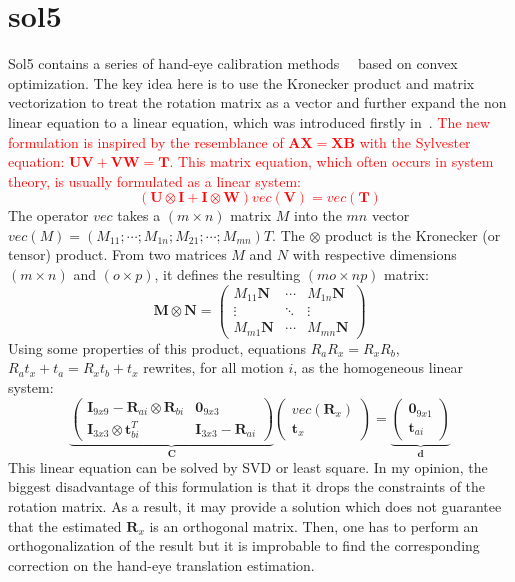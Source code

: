 \documentclass[a4paper]{report}
\begin{document}
\section{sol5}
Sol5 contains a series of hand-eye calibration methods~\cite{zhao2018simultaneous}~\cite{zhao2011hand} based on convex optimization. The key idea here is to use the Kronecker product and matrix vectorization to treat the rotation matrix as a vector and further expand the non linear equation to a linear equation, which was introduced firstly in~\cite{andreff1999line}.
\textcolor{red}{The new formulation is inspired by the resemblance of $\mathbf{AX}=\mathbf{XB}$ with the Sylvester equation: $\mathbf{UV} + \mathbf{VW} = \mathbf{T}$. This matrix equation, which often occurs in system theory, is usually formulated as a linear system:
$$
(\mathbf{U}\otimes\mathbf{I}+\mathbf{I}\otimes\mathbf{W})vec(\mathbf{V})=vec(\mathbf{T})
$$}
The operator $vec$ takes a $(m \times n)$ matrix $M$ into the $mn$ vector $vec(M) =
(M_{11};\cdots;M_{1n};M_{21}; \cdots ;M_{mn})T$. The $\otimes$ product is the Kronecker (or tensor) product. From two matrices $M$ and $N$ with respective
dimensions $(m \times n)$ and $(o \times p)$, it defines the resulting $(mo \times np)$ matrix:
$$
\mathbf{M}\otimes\mathbf{N}=\left(
\begin{matrix}
M_{11}\mathbf{N} & \cdots & M_{1n}\mathbf{N} \\
\vdots & \ddots & \vdots \\
M_{m1}\mathbf{N} & \cdots & M_{mn}\mathbf{N} 
\end{matrix}
\right)
$$
Using some properties of this product, equations $R_aR_x=R_xR_b$, $R_at_x+t_a=R_xt_b+t_x$ rewrites, for all motion $i$, as the homogeneous linear system:
$$
\underbrace{
\left(
\begin{matrix}
\mathbf{I}_{9x9}-\mathbf{R}_{ai}\otimes\mathbf{R}_{bi} & \mathbf{0}_{9x3} \\
\mathbf{I}_{3x3}\otimes\mathbf{t}_{bi}^T & \mathbf{I}_{3x3}-\mathbf{R}_{ai}
\end{matrix}
\right)}_{\mathbf{C}}
\left(
\begin{matrix}
vec(\mathbf{R}_x) \\
\mathbf{t}_x
\end{matrix}
\right)=\underbrace{
\left(
\begin{matrix}
\mathbf{0}_{9x1} \\
\mathbf{t}_{ai}
\end{matrix}
\right)}_{\mathbf{d}}
$$
This linear equation can be solved by SVD or least square. In my opinion, the biggest disadvantage of this formulation is that it drops the constraints of the rotation matrix. As a result, it may provide a solution which does not guarantee that the estimated $\mathbf{R}_x$ is an orthogonal matrix. Then, one has to perform an orthogonalization of the result but it is improbable to find the corresponding correction on the hand-eye translation estimation.
\end{document}
